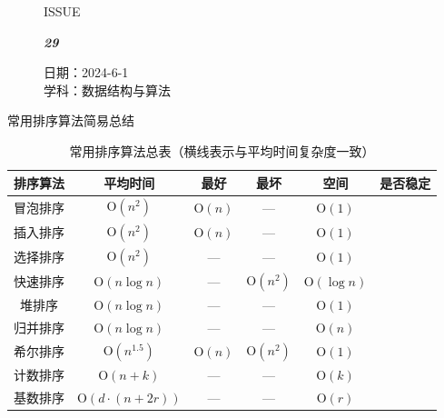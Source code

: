 \documentclass[UTF8]{ctexart}
\newcommand\Black[1]{\textcolor[gray]{0.3}{#1}}
\newcommand\Brown[1]{\textcolor[HTML]{998A4E}{#1}}
\renewcommand\O{\mathrm{O}}
\newcommand\IssueNumber{29}
\newcommand\Date{2024-6-1}
\newcommand\Subject{数据结构与算法}
\begin{document}
\begin{figure}[H]
\hspace{1cm}
\begin{minipage}[t]{0.3\textwidth}
\centering
    \Brown{\Genshin ISSUE}

    \vspace{-0.6cm}
    \Huge \Issue\slshape\bfseries\Black{\IssueNumber}
\end{minipage}
\hfill
\begin{minipage}[t]{0.35\textwidth}
\small
\centering
    \Brown{日期：\Date} \\
\vspace{-0.1cm}
    \Brown{学科：\Subject} \\
\end{minipage}
\hspace{0.8cm}
\end{figure}

\begin{center}
\textcolor{cyan!50!black}{常用排序算法简易总结}
\end{center}

\newcommand\correct{\textcolor{green!50!black}{\ding{51}}}
\newcommand\wrong{\textcolor{red!70!black}{\ding{55}}}
\begin{table}[htb]
  \centering
  \begin{tabular}{cccccc}
\toprule
    \textbf{排序算法} & \textbf{平均时间} & \textbf{最好} & \textbf{最坏} & \textbf{空间} & \textbf{是否稳定} \\
\midrule
    冒泡排序 & $\O(n^2)$ & $\O(n)$ & — & $\O(1)$ & \correct \\
    插入排序 & $\O(n^2)$ & $\O(n)$ & — & $\O(1)$ & \correct \\
    选择排序 & $\O(n^2)$ & — & — & $\O(1)$ & \wrong \\
    快速排序 & $\O(n\log n)$ & — & $\O(n^2)$ & $\O(\log n)$ & \wrong \\
    堆排序 & $\O(n\log n)$ & — & — & $\O(1)$ & \wrong \\
    归并排序 & $\O(n\log n)$ & — & — & $\O(n)$ & \correct \\
    希尔排序 & $\O(n^{1.5})$ & $\O(n)$ & $\O(n^2)$ & $\O(1)$ & \wrong \\
    计数排序 & $\O(n+k)$ & — & — & $\O(k)$ & \correct \\
    基数排序 & $\O(d\cdot(n+2r))$ & — & — & $\O(r)$ & \correct \\
\bottomrule
\end{tabular}
  \caption{常用排序算法总表（横线表示与平均时间复杂度一致）}\label{tab:total}
\end{table}
\end{document}
